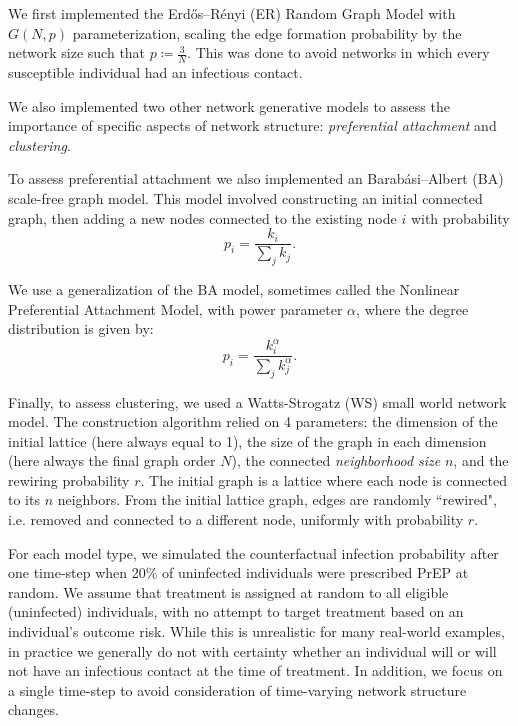 \documentclass{article}
\theoremstyle{definition}
\begin{document}
We first implemented the  Erdős–Rényi (ER) Random Graph Model with $G(N,p)$ parameterization, scaling the edge formation probability by the network size such that $p \coloneqq \frac{3}{N}$. This was done to avoid networks in which every susceptible individual had an infectious contact. 

We also implemented two other network generative models to assess the importance of specific aspects of network structure: \textit{preferential attachment} and \textit{clustering}. 

To assess preferential attachment we also implemented an Barabási–Albert (BA) scale-free graph model. This model involved constructing an initial connected graph, then adding a new nodes connected to the existing node $i$ with probability 
\begin{equation*}
    p_{i}=\frac{k_{i}}{\sum_{j}k_{j}}.
\end{equation*}

We use a generalization of the BA model, sometimes called the Nonlinear Preferential Attachment Model, with power parameter $\alpha$, where the degree distribution is given by:
\begin{equation*}
    p_{i}=\frac{k_{i}^{\alpha}}{\sum_{j}k_{j}^{\alpha}}.
\end{equation*}

Finally, to assess clustering, we used a Watts-Strogatz (WS) small world network model. The construction algorithm relied on 4 parameters: the dimension of the initial lattice (here always equal to 1), the size of the graph in each dimension (here always the final graph order $N$), the connected \textit{neighborhood size} $n$, and the rewiring probability $r$. The initial graph is a lattice where each node is connected to its $n$ neighbors. From the initial lattice graph, edges are randomly ``rewired", i.e. removed and connected to a different node, uniformly with probability $r$.

For each model type, we simulated the counterfactual infection probability after one time-step when 20\% of uninfected individuals were prescribed PrEP at random. We assume that treatment is assigned at random to all eligible (uninfected) individuals, with no attempt to target treatment based on an individual's outcome risk. While this is unrealistic for many real-world examples, in practice we generally do not with certainty whether an individual will or will not have an infectious contact at the time of treatment. In addition, we focus on a single time-step to avoid consideration of time-varying network structure changes.
\end{document}

